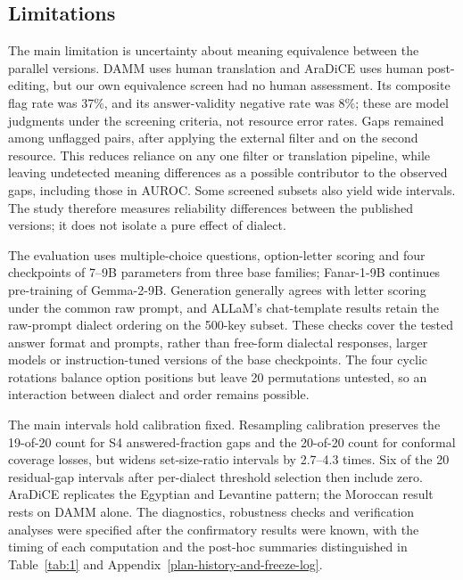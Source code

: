 \documentclass[applsci,article,submit,pdftex,oneauthor]{Definitions/mdpi}
\begin{document}
\hypertarget{limitations}{%
\subsection{Limitations}\label{limitations}}

The main limitation is uncertainty about meaning equivalence between the parallel versions. DAMM uses human translation and AraDiCE uses human post-editing, but our own equivalence screen had no human assessment. Its composite flag rate was 37\%, and its answer-validity negative rate was 8\%; these are model judgments under the screening criteria, not resource error rates. Gaps remained among unflagged pairs, after applying the external filter and on the second resource. This reduces reliance on any one filter or translation pipeline, while leaving undetected meaning differences as a possible contributor to the observed gaps, including those in AUROC. Some screened subsets also yield wide intervals. The study therefore measures reliability differences between the published versions; it does not isolate a pure effect of dialect.

The evaluation uses multiple-choice questions, option-letter scoring and four checkpoints of 7--9B parameters from three base families; Fanar-1-9B continues pre-training of Gemma-2-9B. Generation generally agrees with letter scoring under the common raw prompt, and ALLaM's chat-template results retain the raw-prompt dialect ordering on the 500-key subset. These checks cover the tested answer format and prompts, rather than free-form dialectal responses, larger models or instruction-tuned versions of the base checkpoints. The four cyclic rotations balance option positions but leave 20 permutations untested, so an interaction between dialect and order remains possible.

The main intervals hold calibration fixed. Resampling calibration preserves the 19-of-20 count for S4 answered-fraction gaps and the 20-of-20 count for conformal coverage losses, but widens set-size-ratio intervals by 2.7--4.3 times. Six of the 20 residual-gap intervals after per-dialect threshold selection then include zero. AraDiCE replicates the Egyptian and Levantine pattern; the Moroccan result rests on DAMM alone. The diagnostics, robustness checks and verification analyses were specified after the confirmatory results were known, with the timing of each computation and the post-hoc summaries distinguished in Table~\ref{tab:1} and Appendix~\ref{plan-history-and-freeze-log}.
\end{document}
